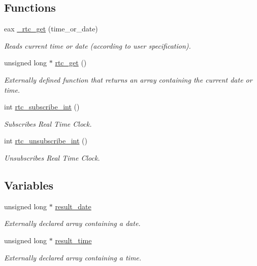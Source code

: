 \subsection*{Functions}
\begin{DoxyCompactItemize}
\item 
eax \hyperlink{group__rtc_gad17bf0ee9de4297ad405b9c197db0eab}{\+\_\+rtc\+\_\+get} (time\+\_\+or\+\_\+date)
\begin{DoxyCompactList}\small\item\em Reads current time or date (according to user specification). \end{DoxyCompactList}\item 
unsigned long $\ast$ \hyperlink{group__rtc_ga4ca5626e3ae7e8da1ad9183a7e6aa999}{rtc\+\_\+get} ()
\begin{DoxyCompactList}\small\item\em Externally defined function that returns an array containing the current date or time. \end{DoxyCompactList}\item 
int \hyperlink{group__rtc_gabd8de825e876e8ef94c64ac616f68a11}{rtc\+\_\+subscribe\+\_\+int} ()
\begin{DoxyCompactList}\small\item\em Subscribes Real Time Clock. \end{DoxyCompactList}\item 
int \hyperlink{group__rtc_gab8f17bf5280c908c8b199a90fefcc758}{rtc\+\_\+unsubscribe\+\_\+int} ()
\begin{DoxyCompactList}\small\item\em Unsubscribes Real Time Clock. \end{DoxyCompactList}\end{DoxyCompactItemize}
\subsection*{Variables}
\begin{DoxyCompactItemize}
\item 
\hypertarget{group__rtc_gadc2ce94d90a689e95b0f88f7209bae2b}{}\label{group__rtc_gadc2ce94d90a689e95b0f88f7209bae2b} 
unsigned long $\ast$ \hyperlink{group__rtc_gadc2ce94d90a689e95b0f88f7209bae2b}{result\+\_\+date}
\begin{DoxyCompactList}\small\item\em Externally declared array containing a date. \end{DoxyCompactList}\item 
\hypertarget{group__rtc_ga3ee7a67468f7238ecea0abc3f33eb1ed}{}\label{group__rtc_ga3ee7a67468f7238ecea0abc3f33eb1ed} 
unsigned long $\ast$ \hyperlink{group__rtc_ga3ee7a67468f7238ecea0abc3f33eb1ed}{result\+\_\+time}
\begin{DoxyCompactList}\small\item\em Externally declared array containing a time. \end{DoxyCompactList}\end{DoxyCompactItemize}


